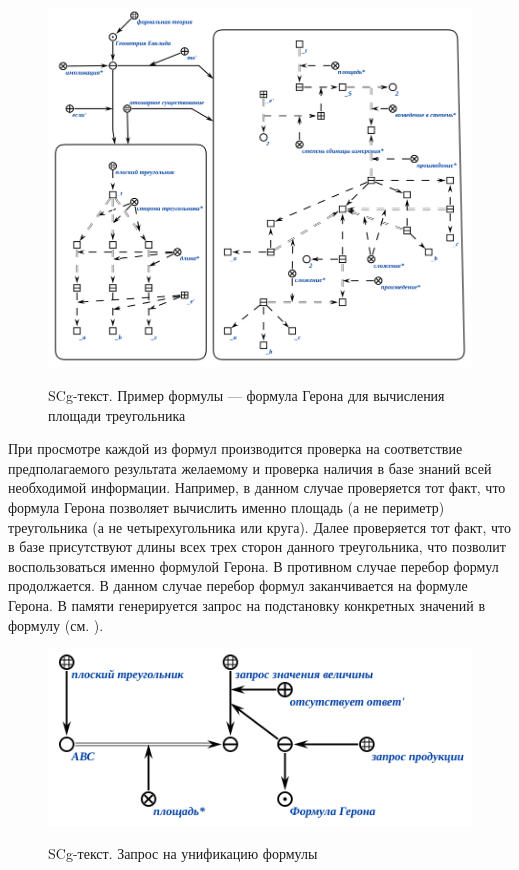 \begin{figure}[H]
	\caption{SCg-текст. Пример формулы --- формула Герона для вычисления площади треугольника}
	\includegraphics[width=1\linewidth]{images/part7/chapter_learning_systems/formula-gerona-kbe.png}
	\label{fig:formula-gerona}
\end{figure}

При просмотре каждой из формул производится проверка на соответствие предполагаемого результата желаемому и проверка наличия в базе знаний всей необходимой информации. Например, в данном случае проверяется тот факт, что формула Герона позволяет вычислить именно площадь (а не периметр) треугольника (а не четырехугольника или круга). Далее проверяется тот факт, что в базе присутствуют длины всех трех сторон данного треугольника, что позволит воспользоваться именно формулой Герона. В противном случае перебор формул продолжается. В данном случае перебор формул заканчивается на формуле Герона. В памяти генерируется запрос на подстановку конкретных значений в формулу (см. ).

\begin{figure}[H]
	\caption{SCg-текст. Запрос на унификацию формулы}
	\includegraphics[scale=0.85]{images/part7/chapter_learning_systems/step3-kbe.png}
	\label{fig:step3}
\end{figure}

